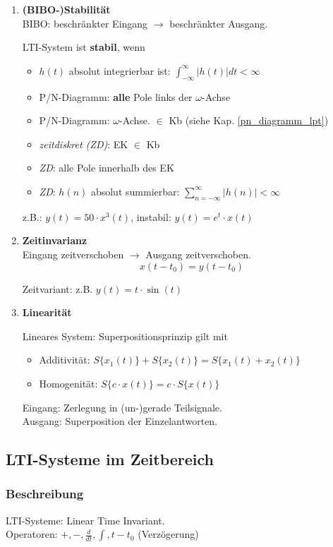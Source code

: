 \begin{enumerate}[leftmargin=*]
  \item {\textbf{(BIBO-)Stabilit\"at}}\\
  \small BIBO: beschr\"ankter Eingang $\rightarrow$ beschr\"ankter Ausgang.\\
\begin{mdframed}[style=exercise]
   LTI-System ist \textbf{stabil}, wenn
   \begin{itemize}
   	   \item $h(t)$ absolut integrierbar ist: $\int_{-\infty}^{\infty} |h(t)| dt <\infty$
   	   \item P/N-Diagramm: \textbf{alle} Pole links der $\omega$-Achse
   	   \item P/N-Diagramm: $\omega$-Achse. $\in$ Kb (siehe Kap. \ref{pn_diagramm_lpt})
   	   \item \textit{zeitdiskret (ZD)}: EK $\in$ Kb
   	   \item \textit{ZD}: alle Pole innerhalb
   	   des EK
   	    \item \textit{ZD}: $h(n)$ absolut summierbar: $\sum_{n=-\infty}^{\infty} |h(n)|<\infty$
   \end{itemize}
  \end{mdframed}
     z.B.: $y(t) = 50\cdot x^3(t)$, instabil: $y(t) = e^{t}\cdot x(t)$
  \item{\textbf{Zeitinvarianz}}\\
		{\small
		  	Eingang zeitverschoben $\rightarrow$ Ausgang zeitverschoben.
		}
		\[ 
		x(t-t_0) = y(t-t_0)
		 \]
		 
		 {\small Zeitvariant: z.B. $y(t)=t\cdot \sin(t)$}
  \item{\textbf{Linearit\"at}}\\
		  {\small
		      Lineares System: Superpositionsprinzip gilt mit 
		      \begin{itemize}
		      	\item Additivität: $S\{x_1(t)\} + S\{x_2(t)\} = S\{x_1(t)+x_2(t)\}$ 
		      	\item Homogenität: $S\{c\cdot x(t)\}=c \cdot S\{x(t)\}$
		      \end{itemize}
		      Eingang: Zerlegung in (un-)gerade Teilsignale.\\
		      Ausgang: Superposition der Einzelantworten.
		  }
\end{enumerate}
\normalsize
\subsection{LTI-Systeme im Zeitbereich}
\subsubsection{Beschreibung}
 \small
LTI-Systeme: Linear Time Invariant.\\
Operatoren: $+, -, \frac{d}{dt}, \int, t-t_0$ (Verz\"ogerung)\\

